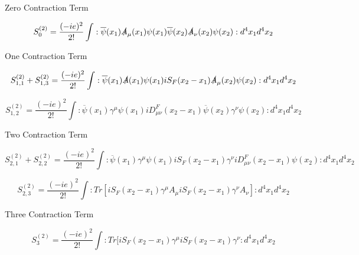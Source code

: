 \documentclass[a4]{article}
\begin{document}
        \begin{framed}
            \begin{center}
                Zero Contraction Term
            \end{center}

            \begin{equation}
                S^{(2)}_{0} = \frac{(-ie)^2}{2!} \int :\overline{\psi} (x_1) \slashed{A}_{\mu} (x_1) \psi (x_1) \overline{\psi} (x_2) \slashed{A}_{\nu} (x_2) \psi (x_2): d^{4} x_{1} d^{4} x_{2}
            \end{equation}

            \begin{center}
                One Contraction Term
            \end{center}

            \begin{equation}
                S^{(2)}_{1,1} +  S^{(2)}_{1,3} = \frac{(-ie)^2}{2!} \int :\overline{\psi} (x_1) \slashed{A} (x_1) \psi (x_1) i S_{F} (x_{2} - x_{1}) \slashed{A}_{\mu} (x_2) \psi (x_2): d^{4} x_{1} d^{4} x_{2}
            \end{equation}

            \begin{equation}
                S^{(2)}_{1,2} = \frac{(-ie)^2}{2!} \int :\overline{\psi} (x_1) \gamma^{\mu} \psi (x_1) i D^{F}_{\mu \nu} (x_{2} - x_{1}) \overline{\psi} (x_2) \gamma^{\nu} \psi (x_2): d^{4} x_{1} d^{4} x_{2}
            \end{equation}

            \begin{center}
                Two Contraction Term
            \end{center}

            \begin{equation}
                S^{(2)}_{2,1} + S^{(2)}_{2,2} = \frac{(-ie)^2}{2!} \int :\overline{\psi} (x_1) \gamma^{\mu} \psi (x_1) i S_{F} (x_{2} - x_{1}) \gamma^{\nu} i D^{F}_{\mu \nu} (x_{2} - x_{1}) \psi (x_2): d^{4} x_{1} d^{4} x_{2}
            \end{equation}

            \begin{equation}
                S^{(2)}_{2,3} = \frac{(-ie)^2}{2!} \int :Tr[i S_{F} (x_{2} - x_{1}) \gamma^{\mu} A_{\mu} i S_{F} (x_{2} - x_{1}) \gamma^{\nu} A_{\nu}]: d^{4} x_{1} d^{4} x_{2}
            \end{equation}

            \begin{center}
                Three Contraction Term
            \end{center}

            \begin{equation}
                S^{(2)}_{3} = \frac{(-ie)^2}{2!} \int :Tr[i S_{F} (x_{2} - x_{1}) \gamma^{\mu} i S_{F} (x_{2} - x_{1}) \gamma^{\nu}: d^{4} x_{1} d^{4} x_{2}
            \end{equation}

        \end{framed}
\end{document}
